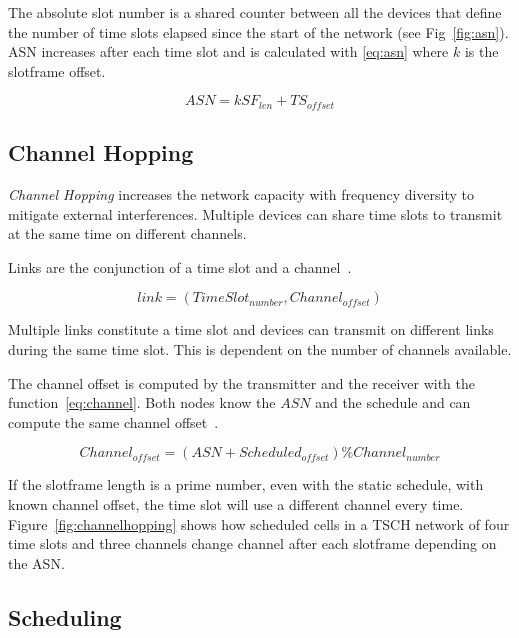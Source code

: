 The absolute slot number is a shared counter between all the devices that
define the number of time slots elapsed since the start of the
network (see Fig~\ref{fig:asn}).
ASN increases after each time slot and is calculated with \ref{eq:asn} where $k$
is the slotframe offset.

\begin{equation}
  \label{eq:asn}
  ASN = k SF_{len} + TS_{offset}
\end{equation}



\subsection{Channel Hopping}

\emph{Channel Hopping} increases the network capacity with frequency diversity
to mitigate external interferences.
Multiple devices can share time slots to transmit at the same time on different
channels.

Links are the conjunction of a time slot and a channel~\cite{Chen2013PerformanceAO}.

\begin{equation}
  \label{eq:links}
  link = (TimeSlot_{number}, Channel_{offset})
\end{equation}

Multiple links constitute a time slot and devices can transmit on different
links during the same time slot.
This is dependent on the number of channels available.

The channel offset is computed by the transmitter and the receiver with the
function~\ref{eq:channel}. Both nodes know the $ASN$ and the schedule and can
compute the same channel offset~\cite{rfc7554}.

\begin{equation}
  \label{eq:channel}
  Channel_{offset} = (ASN + Scheduled_{offset}) \% Channel_{number}
\end{equation}

If the slotframe length is a prime number, even with the static schedule,
with known channel offset, the time slot will use a different channel every time.
Figure~\ref{fig:channelhopping} shows how scheduled cells in a TSCH network of
four time slots and three channels change channel after each slotframe depending
on the ASN.



\subsection{Scheduling\label{section:tschscheduling}}

